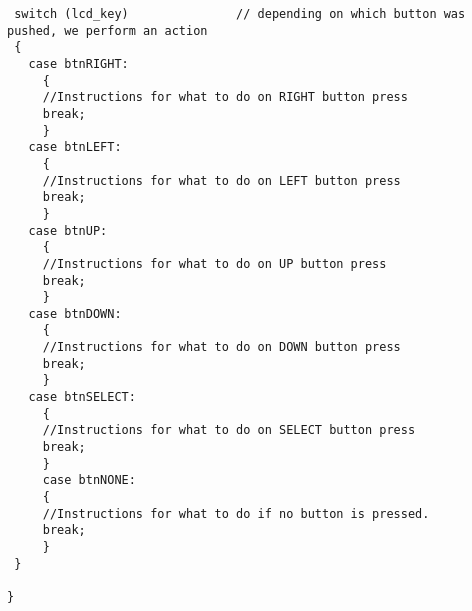 \documentclass[10pt]{report}
\begin{document}
\begin{verbatim}
 switch (lcd_key)               // depending on which button was pushed, we perform an action
 {
   case btnRIGHT:
     {
     //Instructions for what to do on RIGHT button press
     break;
     }
   case btnLEFT:
     {
     //Instructions for what to do on LEFT button press
     break;
     }
   case btnUP:
     {
     //Instructions for what to do on UP button press
     break;
     }
   case btnDOWN:
     {
     //Instructions for what to do on DOWN button press
     break;
     }
   case btnSELECT:
     {
     //Instructions for what to do on SELECT button press
     break;
     }
     case btnNONE:
     {
     //Instructions for what to do if no button is pressed.
     break;
     }
 }
 
}

\end{verbatim}
\end{document}
